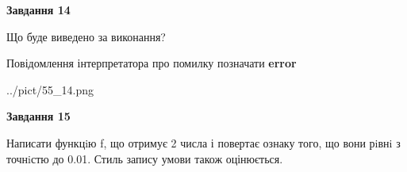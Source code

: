 \documentclass[11pt, ukrainian]{article}
\begin{document}
{\begin {large}
{\begin {center}\textbf{Завдання 14}\end {center}}\par
Що буде виведено за виконання? \par
Повідомлення інтерпретатора про помилку позначати \textbf{error}

\begin{center}
	{../pict/55_14.png}
\end{center}
\newpage

{\begin {center}\textbf{Завдання 15}\end {center}}\par

Написати функцiю f, що отримує 2 числа і повертає ознаку того, що вони рiвнi з точнiстю до 0.01. Стиль запису умови також оцінюється.\par
\newpage

\end {large}}
\end{document}
